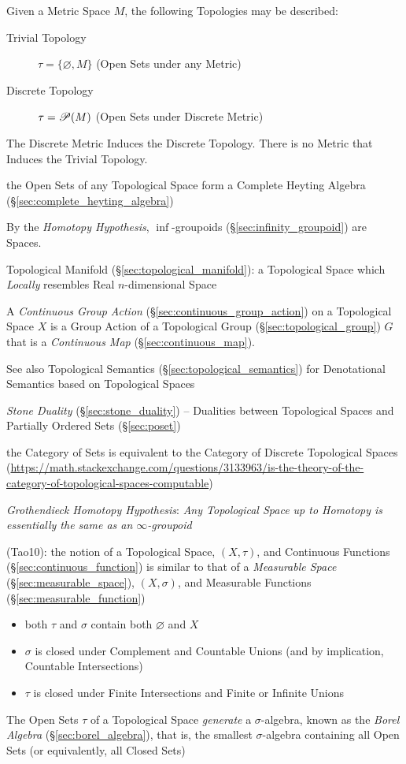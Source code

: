 Given a Metric Space $M$, the following Topologies may be described:
\begin{description}
\item[Trivial Topology] $\tau = \{\varnothing, M\}$ (Open Sets under
  any Metric)

\item[Discrete Topology] $\tau = \mathscr{P}(M)$ (Open Sets under
  Discrete Metric)
\end{description}
The Discrete Metric Induces the Discrete Topology. There is no Metric
that Induces the Trivial Topology.

the Open Sets of any Topological Space form a Complete Heyting Algebra
(\S\ref{sec:complete_heyting_algebra})

By the \emph{Homotopy Hypothesis}, $\inf$-groupoids
(\S\ref{sec:infinity_groupoid}) are Spaces.

\fist Topological Manifold (\S\ref{sec:topological_manifold}): a Topological
Space which \emph{Locally} resembles Real $n$-dimensional Space

A \emph{Continuous Group Action} (\S\ref{sec:continuous_group_action}) on a
Topological Space $X$ is a Group Action of a Topological Group
(\S\ref{sec:topological_group}) $G$ that is a \emph{Continuous Map}
(\S\ref{sec:continuous_map}).

\fist See also Topological Semantics
(\S\ref{sec:topological_semantics}) for Denotational Semantics based
on Topological Spaces

\emph{Stone Duality} (\S\ref{sec:stone_duality}) -- Dualities between
Topological Spaces and Partially Ordered Sets (\S\ref{sec:poset})

the Category of Sets is equivalent to the Category of Discrete Topological
Spaces
(\url{https://math.stackexchange.com/questions/3133963/is-the-theory-of-the-category-of-topological-spaces-computable})

\emph{Grothendieck Homotopy Hypothesis}:
\emph{
  Any Topological Space up to Homotopy is essentially the same as an
  $\infty$-groupoid
}

(Tao10):
the notion of a Topological Space, $(X,\tau)$, and Continuous Functions
(\S\ref{sec:continuous_function}) is similar to that of a \emph{Measurable
  Space} (\S\ref{sec:measurable_space}), $(X,\sigma)$, and Measurable Functions
(\S\ref{sec:measurable_function})
\begin{itemize}
  \item both $\tau$ and $\sigma$ contain both $\varnothing$ and $X$
  \item $\sigma$ is closed under Complement and Countable Unions (and
    by implication, Countable Intersections)
  \item $\tau$ is closed under Finite Intersections and Finite or Infinite
    Unions
\end{itemize}
The Open Sets $\tau$ of a Topological Space \emph{generate} a $\sigma$-algebra,
known as the \emph{Borel Algebra} (\S\ref{sec:borel_algebra}), that is, the
smallest $\sigma$-algebra containing all Open Sets (or equivalently, all Closed
Sets)

